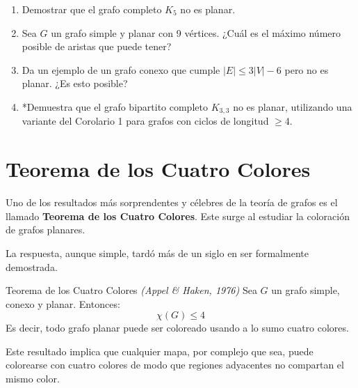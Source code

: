 \begin{enumerate}
  \item  Demostrar que el grafo completo \( K_5 \) no es planar.

  \item Sea \( G \) un grafo simple y planar con 9 vértices. ¿Cuál es el máximo número posible de aristas que puede tener?
  \item Da un ejemplo de un grafo conexo que cumple \( |E| \leq 3|V| - 6 \) pero no es planar. ¿Es esto posible?
  \item{*}Demuestra que el grafo bipartito completo \( K_{3,3} \) no es planar, utilizando una variante del Corolario 1 para grafos con ciclos de longitud $\geq4$.

\end{enumerate}


\section{Teorema de los Cuatro Colores}

Uno de los resultados más sorprendentes y célebres de la teoría de grafos es el llamado \textbf{Teorema de los Cuatro Colores}. Este surge al estudiar la coloración de grafos planares.

La respuesta, aunque simple, tardó más de un siglo en ser formalmente demostrada.

\begin{thmblock}{Teorema de los Cuatro Colores \textit{(Appel \& Haken, 1976)}}
Sea \( G \) un grafo simple, conexo y planar. Entonces:
\[
\chi(G) \leq 4
\]
Es decir, todo grafo planar puede ser coloreado usando a lo sumo cuatro colores.
\end{thmblock}

Este resultado implica que cualquier mapa, por complejo que sea, puede colorearse con cuatro colores de modo que regiones adyacentes no compartan el mismo color.

